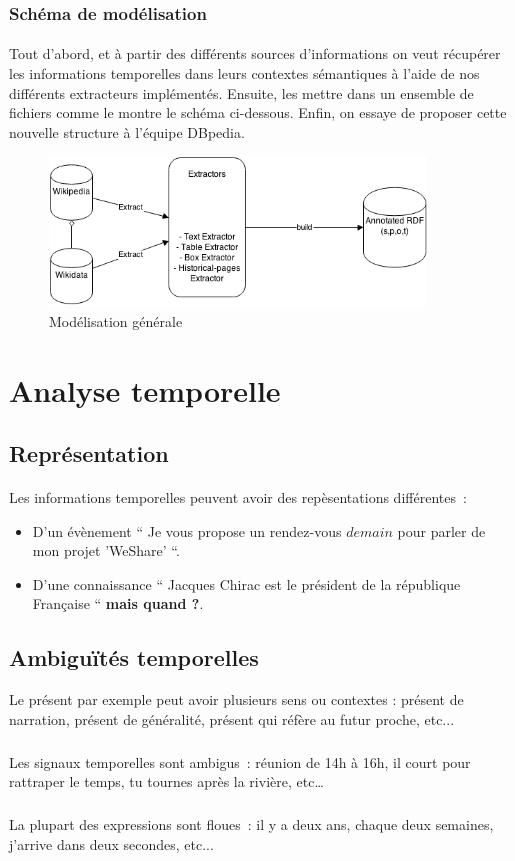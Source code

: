 \subsubsection*{Schéma de modélisation}
\paragraph{}
Tout d’abord, et à partir des différents sources d’informations on veut récupérer les informations temporelles dans leurs contextes sémantiques à l’aide de nos différents extracteurs implémentés. 
Ensuite, les mettre dans un ensemble de fichiers comme le montre le schéma ci-dessous.
Enfin, on essaye de proposer cette nouvelle structure à l’équipe DBpedia.
\begin{figure}[H]
        \centering
                \centering
                \includegraphics[width=10cm]{modelisation.png}
               \caption{Modélisation générale}

\end{figure}
\section*{Analyse temporelle}
\subsection*{Représentation}
\paragraph{}
Les informations temporelles peuvent avoir des repèsentations différentes~: 
\begin{itemize}
\item D'un évènement `` Je vous propose un rendez-vous $demain$ pour parler de mon projet 'WeShare' ``. \item D'une connaissance `` Jacques Chirac est le président de la république Française `` \textbf{ mais quand ?}.

\end{itemize}
 
\subsection*{Ambiguïtés temporelles}
Le présent par exemple peut avoir plusieurs sens ou contextes : présent de narration, présent de généralité, présent qui réfère au futur proche, etc...
\subparagraph{}
Les signaux temporelles sont ambigus~: réunion de 14h à 16h, il court pour rattraper le temps, tu tournes après la rivière, etc…
\subparagraph{}
La plupart des expressions sont floues~: il y a deux ans, chaque deux semaines, j’arrive dans deux secondes, etc...
